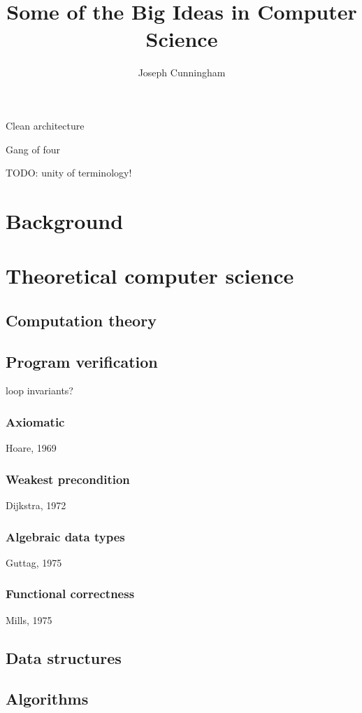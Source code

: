 \documentclass{report}
\title{Some of the Big Ideas in Computer Science}
\author{Joseph Cunningham}
\date{}
\begin{document}
\maketitle
\tableofcontents

Clean architecture

Gang of four

TODO: unity of terminology!

\part{Background}
\setcounter{chapter}{0} %


\part{Theoretical computer science}
\setcounter{chapter}{0} %

\chapter{Computation theory}


\chapter{Program verification}
loop invariants?
\section{Axiomatic}
Hoare, 1969
\section{Weakest precondition}
Dijkstra, 1972
\section{Algebraic data types}
Guttag, 1975
\section{Functional correctness}
Mills, 1975

\chapter{Data structures}


\chapter{Algorithms}

\end{document}
